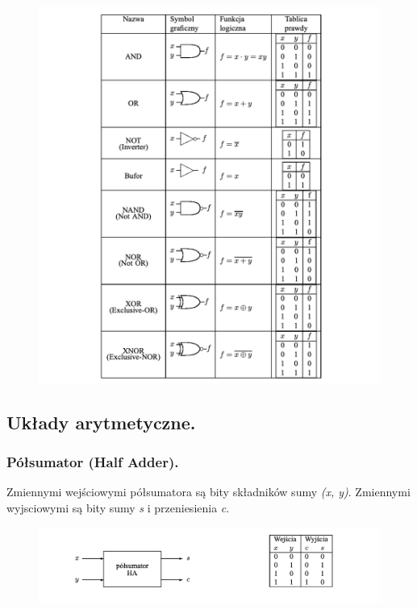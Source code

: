 \documentclass[12pt]{article}
\begin{document}
    \begin{figure}[H]
        \includegraphics[width=\linewidth]{uk/bramki.png}
    \end{figure}

    \subsection{Układy arytmetyczne.}

    \subsubsection{Półsumator (Half Adder).}
    Zmiennymi wejściowymi półsumatora są bity składników sumy \textit{(x, y)}. Zmiennymi wyjsciowymi są bity
    sumy \textit{s} i przeniesienia \textit{c}.

    \begin{figure}[H]
        \includegraphics[width=\linewidth]{uk/ha.png}
    \end{figure}
\end{document}
